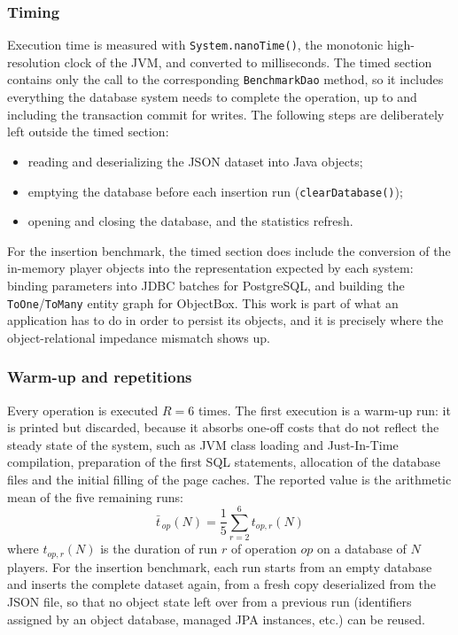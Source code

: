 \documentclass{article}
\begin{document}
\subsubsection{Timing}
Execution time is measured with \texttt{System.nanoTime()}, the monotonic high-resolution clock of the JVM, and converted to milliseconds. The timed section contains only the call to the corresponding \texttt{BenchmarkDao} method, so it includes everything the database system needs to complete the operation, up to and including the transaction commit for writes. The following steps are deliberately left outside the timed section:
\begin{itemize}
    \item reading and deserializing the JSON dataset into Java objects;
    \item emptying the database before each insertion run (\texttt{clearDatabase()});
    \item opening and closing the database, and the statistics refresh.
\end{itemize}
For the insertion benchmark, the timed section does include the conversion of the in-memory player objects into the representation expected by each system: binding parameters into JDBC batches for PostgreSQL, and building the \texttt{ToOne}/\texttt{ToMany} entity graph for ObjectBox. This work is part of what an application has to do in order to persist its objects, and it is precisely where the object-relational impedance mismatch shows up.

\subsubsection{Warm-up and repetitions}
Every operation is executed $R = 6$ times. The first execution is a warm-up run: it is printed but discarded, because it absorbs one-off costs that do not reflect the steady state of the system, such as JVM class loading and Just-In-Time compilation, preparation of the first SQL statements, allocation of the database files and the initial filling of the page caches. The reported value is the arithmetic mean of the five remaining runs:
\begin{equation}
    \bar{t}_{\,op}(N) = \frac{1}{5} \sum_{r=2}^{6} t_{op,r}(N)
    \label{eq:mean}
\end{equation}
where $t_{op,r}(N)$ is the duration of run $r$ of operation $op$ on a database of $N$ players. For the insertion benchmark, each run starts from an empty database and inserts the complete dataset again, from a fresh copy deserialized from the JSON file, so that no object state left over from a previous run (identifiers assigned by an object database, managed JPA instances, etc.) can be reused.
\end{document}
